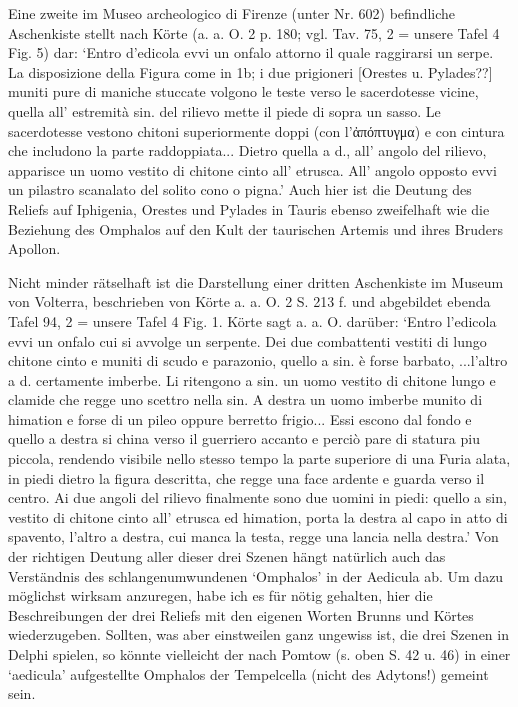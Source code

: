 \documentclass[a4paper, 11pt, oneside]{article}
\begin{document}
Eine zweite im Museo archeologico di Firenze (unter Nr. 602) befindliche Aschenkiste stellt nach Körte (a. a. O. 2 p. 180; vgl. Tav. 75, 2 = unsere Tafel 4 Fig. 5) dar: `Entro d'edicola evvi un onfalo attorno il quale raggirarsi un serpe. La disposizione della Figura come in 1b; i due prigioneri [Orestes u. Pylades??] muniti pure di maniche stuccate volgono le teste verso le sacerdotesse vicine, quella all' estremità sin. del rilievo mette il piede di sopra un sasso. Le sacerdotesse vestono chitoni superiormente doppi (con l'ἀπόπτυγμα) e con cintura che includono la parte raddoppiata... Dietro quella a d., all' angolo del rilievo, apparisce un uomo vestito di chitone cinto all' etrusca. All' angolo opposto evvi un pilastro scanalato del solito cono o pigna.' Auch hier ist die Deutung des Reliefs auf Iphigenia, Orestes und Pylades in Tauris ebenso zweifelhaft wie die Beziehung des Omphalos auf den Kult der taurischen Artemis und ihres Bruders Apollon.

Nicht minder rätselhaft ist die Darstellung einer dritten Aschenkiste im Museum von Volterra, beschrieben von Körte a. a. O. 2 S. 213 f. und abgebildet ebenda Tafel 94, 2 = unsere Tafel 4 Fig. 1. Körte sagt a. a. O. darüber: `Entro l'edicola evvi un onfalo cui si avvolge un serpente. Dei due combattenti vestiti di lungo chitone cinto e muniti di scudo e parazonio, quello a sin. è forse barbato, ...l'altro a d. certamente imberbe. Li ritengono a sin. un uomo vestito di chitone lungo e clamide che regge uno scettro nella sin. A destra un uomo imberbe munito di himation e forse di un pileo oppure berretto frigio... Essi escono dal fondo e quello a destra si china verso il guerriero accanto e perciò pare di statura piu piccola, rendendo visibile nello stesso tempo la parte superiore di una Furia alata, in piedi dietro la figura descritta, che regge una face ardente e guarda verso il centro. Ai due angoli del rilievo finalmente sono due uomini in piedi: quello a sin, vestito di chitone cinto all' etrusca ed himation, porta la destra al capo in atto di spavento, l'altro a destra, cui manca la testa, regge una lancia nella destra.' Von der richtigen Deutung aller dieser drei Szenen hängt natürlich auch das Verständnis des schlangenumwundenen `Omphalos' in der Aedicula ab. Um dazu möglichst wirksam anzuregen, habe ich es für nötig gehalten, hier die Beschreibungen der drei Reliefs mit den eigenen Worten Brunns und Körtes wiederzugeben. Sollten, was aber einstweilen ganz ungewiss ist, die drei Szenen in Delphi spielen, so könnte vielleicht der nach Pomtow (s. oben S. 42 u. 46) in einer `aedicula' aufgestellte Omphalos der Tempelcella (nicht des Adytons!) gemeint sein.
\end{document}
